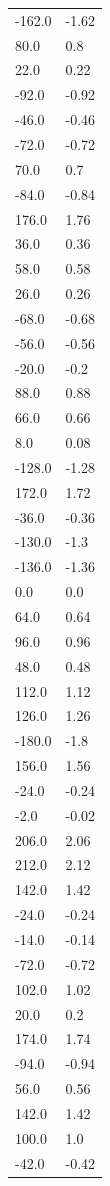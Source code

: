 \begin{longtable}{ll}
-162.0 & -1.62 \\
80.0 & 0.8 \\
22.0 & 0.22 \\
-92.0 & -0.92 \\
-46.0 & -0.46 \\
-72.0 & -0.72 \\
70.0 & 0.7 \\
-84.0 & -0.84 \\
176.0 & 1.76 \\
36.0 & 0.36 \\
58.0 & 0.58 \\
26.0 & 0.26 \\
-68.0 & -0.68 \\
-56.0 & -0.56 \\
-20.0 & -0.2 \\
88.0 & 0.88 \\
66.0 & 0.66 \\
8.0 & 0.08 \\
-128.0 & -1.28 \\
172.0 & 1.72 \\
-36.0 & -0.36 \\
-130.0 & -1.3 \\
-136.0 & -1.36 \\
0.0 & 0.0 \\
64.0 & 0.64 \\
96.0 & 0.96 \\
48.0 & 0.48 \\
112.0 & 1.12 \\
126.0 & 1.26 \\
-180.0 & -1.8 \\
156.0 & 1.56 \\
-24.0 & -0.24 \\
-2.0 & -0.02 \\
206.0 & 2.06 \\
212.0 & 2.12 \\
142.0 & 1.42 \\
-24.0 & -0.24 \\
-14.0 & -0.14 \\
-72.0 & -0.72 \\
102.0 & 1.02 \\
20.0 & 0.2 \\
174.0 & 1.74 \\
-94.0 & -0.94 \\
56.0 & 0.56 \\
142.0 & 1.42 \\
100.0 & 1.0 \\
-42.0 & -0.42 \\

\end{longtable}
